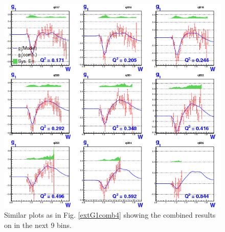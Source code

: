 \begin{figure}[H] %
  \centering
  \leavevmode \includegraphics[width=1.0\textwidth]{figuresEG4/FigResults/combinedG1_C71S181EbBothNoQeWbins70NwPd3.png} 
  \caption[Combined $g_{1}$ (in next 9 \qsqs bins)]{Similar plots as in Fig. \ref{extG1comb4} showing the combined results on \gones in the next 9 \qsqs bins.}
  \label{extG1comb3} 
\end{figure}



